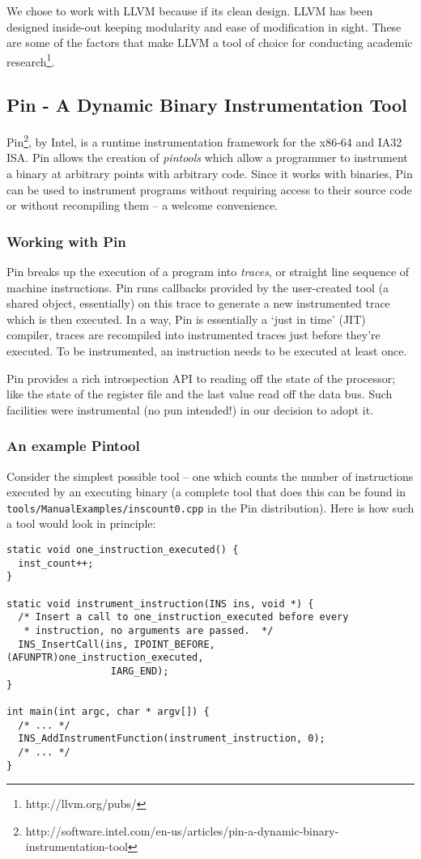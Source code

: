 We chose to work with LLVM because if its clean design.  LLVM has been
designed inside-out keeping modularity and ease of modification in
sight.  These are some of the factors that make LLVM a tool of choice
for conducting academic research\footnote{http://llvm.org/pubs/}.

\subsection{Pin - A Dynamic Binary Instrumentation Tool}

Pin\footnote{http://software.intel.com/en-us/articles/pin-a-dynamic-binary-instrumentation-tool},
by Intel, is a runtime instrumentation framework for the x86-64 and
IA32 ISA.  Pin allows the creation of \textit{pintools} which allow a
programmer to instrument a binary at arbitrary points with arbitrary
code.  Since it works with binaries, Pin can be used to instrument
programs without requiring access to their source code or without
recompiling them -- a welcome convenience.

\subsubsection{Working with Pin}

Pin breaks up the execution of a program into \textit{traces}, or
straight line sequence of machine instructions.  Pin runs callbacks
provided by the user-created tool (a shared object, essentially) on
this trace to generate a new instrumented trace which is then
executed.  In a way, Pin is essentially a `just in time' (JIT)
compiler, traces are recompiled into instrumented traces just before
they're executed.  To be instrumented, an instruction needs to be
executed at least once.

Pin provides a rich introspection API to reading off the state of the
processor; like the state of the register file and the last value read
off the data bus.  Such facilities were instrumental (no pun
intended!) in our decision to adopt it.

\subsubsection{An example Pintool}

Consider the simplest possible tool -- one which counts the number of
instructions executed by an executing binary (a complete tool that
does this can be found in \texttt{tools/ManualExamples/inscount0.cpp}
in the Pin distribution).  Here is how such a tool would look in
principle:

\begin{verbatim}
static void one_instruction_executed() {
  inst_count++;
}

static void instrument_instruction(INS ins, void *) {
  /* Insert a call to one_instruction_executed before every 
   * instruction, no arguments are passed.  */
  INS_InsertCall(ins, IPOINT_BEFORE, (AFUNPTR)one_instruction_executed, 
                  IARG_END);
}

int main(int argc, char * argv[]) {
  /* ... */
  INS_AddInstrumentFunction(instrument_instruction, 0);
  /* ... */
}
\end{verbatim}

